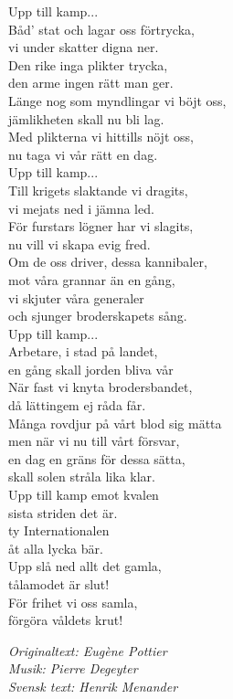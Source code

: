 \documentclass[a6paper,10pt]{article}
\newcommand{\auth}[1]{\begin{flushright}\textit{#1}\end{flushright}}
\newenvironment{lyrics}{}{} %
\begin{document}
\begin{lyrics}
Upp till kamp... \\
\newline
Båd' stat och lagar oss förtrycka, \\
vi under skatter digna ner. \\
Den rike inga plikter trycka, \\
den arme ingen rätt man ger. \\
Länge nog som myndlingar vi böjt oss, \\
jämlikheten skall nu bli lag. \\
Med plikterna vi hittills nöjt oss, \\
nu taga vi vår rätt en dag. \\
\newline
Upp till kamp... \\
\newline
Till krigets slaktande vi dragits, \\
vi mejats ned i jämna led. \\
För furstars lögner har vi slagits, \\
nu vill vi skapa evig fred. \\
Om de oss driver, dessa kannibaler, \\
mot våra grannar än en gång, \\
vi skjuter våra generaler \\
och sjunger broderskapets sång. \\
\newpage
\setlength{\oddsidemargin}{-0.47in}
\noindent
Upp till kamp... \\
\newline
Arbetare, i stad på landet, \\
en gång skall jorden bliva vår\\ 
När fast vi knyta brodersbandet, \\
då lättingem ej råda får. \\
Många rovdjur på vårt blod sig mätta \\
men när vi nu till vårt försvar, \\
en dag en gräns för dessa sätta,\\ 
skall solen stråla lika klar. \\
\newline
Upp till kamp emot kvalen \\
sista striden det är. \\
ty Internationalen \\
åt alla lycka bär. \\
Upp slå ned allt det gamla,\\
tålamodet är slut!\\
För frihet vi oss samla,\\
förgöra våldets krut!
\end{lyrics}
\auth{Originaltext: Eugène Pottier\\
Musik: Pierre Degeyter\\
Svensk text: Henrik Menander}
\end{document}
